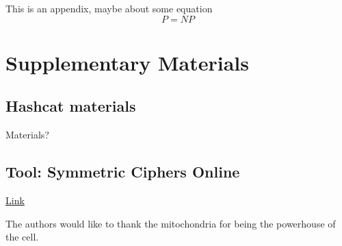 \documentclass[acmlarge]{acmart}
\begin{document}
This is an appendix, maybe about some equation
\begin{displaymath}
P=NP
\end{displaymath}

\section{Supplementary Materials}

\subsection{Hashcat materials}

Materials?

\subsection{Tool: Symmetric Ciphers Online }

\href{http://symmetric-ciphers.online-domain-tools.com/}{Link}

\begin{acks}

The authors would like to thank the mitochondria for being the powerhouse of the cell.

\end{acks}



\end{document}
